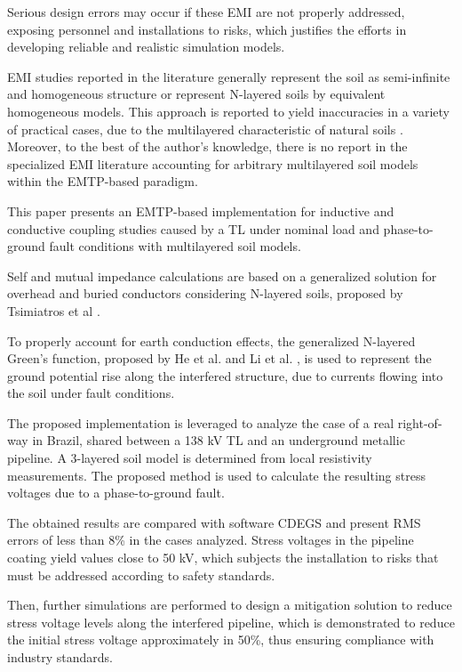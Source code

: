\documentclass{IEEEtran4PSCC}
\begin{document}
Serious design errors may occur if these EMI are not properly addressed, exposing personnel and installations to risks, which justifies the efforts in developing reliable and realistic simulation models.

EMI studies reported in the literature generally represent the soil as semi-infinite and homogeneous structure or represent N-layered soils by equivalent homogeneous models. This  approach is reported to yield inaccuracies in a variety of practical cases, due to the multilayered characteristic of natural soils  \cite{Qi2013,Wu2017,Alexandru2020}. Moreover, to the best of the author's knowledge, there is no report in the specialized EMI literature accounting for arbitrary multilayered soil models within the EMTP-based paradigm.

This paper presents an EMTP-based implementation for inductive and conductive coupling studies caused by a TL under nominal load and phase-to-ground fault conditions with multilayered soil models.

Self and mutual impedance calculations are based on a generalized solution for overhead and buried conductors considering N-layered soils, proposed by Tsimiatros et al \cite{Tsiamitros2008a}.

To properly account for earth conduction effects, the generalized N-layered Green's function, proposed by He et al. \cite{He2012} and Li et al. \cite{Li2006}, is used to represent the ground potential rise along the interfered structure, due to currents flowing into the soil under fault conditions.

The proposed implementation is leveraged to analyze the case of a real right-of-way in Brazil, shared between a 138 kV TL and an underground metallic pipeline. A 3-layered soil model is determined from local resistivity measurements. The proposed method is used to calculate the resulting stress voltages due to a phase-to-ground fault. 

The obtained results are compared with software CDEGS and present RMS errors of less than 8\% in the cases analyzed. Stress voltages in the pipeline coating yield values close to 50 kV, which subjects the installation to risks that must be addressed according to safety standards. 

Then, further simulations are performed to design a mitigation solution to reduce stress voltage levels along the interfered pipeline, which is demonstrated to reduce the initial stress voltage approximately in 50\%, thus ensuring compliance with industry standards.
\end{document}
